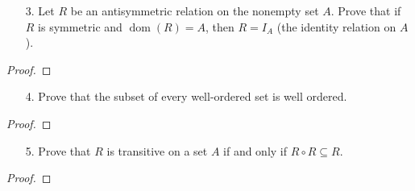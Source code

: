 \documentclass[10pt]{article}
\theoremstyle{definition}
\theoremstyle{plain}
\DeclareMathOperator\dom{dom}
\begin{document}
\pagebreak



\begin{enumerate}
  \item[3.] Let $R$ be an antisymmetric relation on the nonempty set $A$.  Prove that if $R$ is symmetric and $\dom(R) = A$, then $R = I_A$ (the identity relation on $A$).
\end{enumerate}

\setcounter{equation}{0}
\begin{proof}

\end{proof}



\pagebreak



\begin{enumerate}
  \item[4.] Prove that the subset of every well-ordered set is well ordered.
\end{enumerate}

\setcounter{equation}{0}
\begin{proof}
\end{proof}



\pagebreak



\begin{enumerate}
  \item[5.] Prove that $R$ is transitive on a set $A$ if and only if $R \circ R \subseteq R$.
\end{enumerate}

\setcounter{equation}{0}
\begin{proof}
\end{proof}
\end{document}

